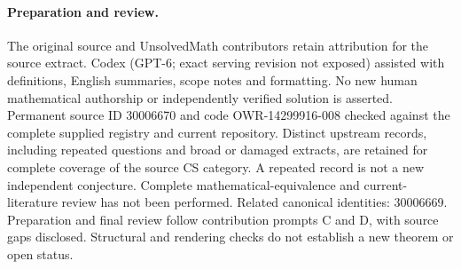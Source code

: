 \documentclass[11pt]{article}
\begin{document}
\paragraph{Preparation and review.}
The original source and UnsolvedMath contributors retain attribution for the source extract. Codex (GPT-6; exact serving revision not exposed) assisted with definitions, English summaries, scope notes and formatting. No new human mathematical authorship or independently verified solution is asserted. Permanent source ID 30006670 and code OWR-14299916-008 checked against the complete supplied registry and current repository. Distinct upstream records, including repeated questions and broad or damaged extracts, are retained for complete coverage of the source CS category. A repeated record is not a new independent conjecture. Complete mathematical-equivalence and current-literature review has not been performed. Related canonical identities: 30006669. Preparation and final review follow contribution prompts C and D, with source gaps disclosed. Structural and rendering checks do not establish a new theorem or open status.
\label{end:30006670}
\end{document}
